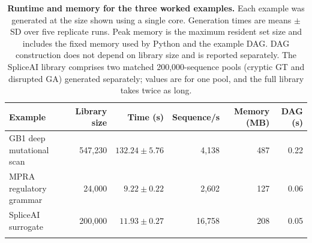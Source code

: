 \clearpage

\begin{table}[p]
\centering
\footnotesize
\caption{\textbf{Runtime and memory for the three worked examples.} Each example was generated at the size shown using a single core. Generation times are means $\pm$ SD over five replicate runs. Peak memory is the maximum resident set size and includes the fixed memory used by Python and the example DAG. DAG construction does not depend on library size and is reported separately. The SpliceAI library comprises two matched 200,000-sequence pools (cryptic GT and disrupted GA) generated separately; values are for one pool, and the full library takes twice as long.}
\label{tab:benchmark-summary}
\begin{tabular}{@{}lrrrrr@{}}
\toprule
Example & Library size & Time (s) & Sequence/s & Memory (MB) & DAG (s)\\
\midrule
GB1 deep mutational scan & 547,230 & $132.24 \pm 5.76$ & 4,138 & 487 & 0.22\\
MPRA regulatory grammar & 24,000 & $9.22 \pm 0.22$ & 2,602 & 127 & 0.06\\
SpliceAI surrogate & 200,000 & $11.93 \pm 0.27$ & 16,758 & 208 & 0.05\\
\botrule
\end{tabular}
\end{table}

\clearpage

